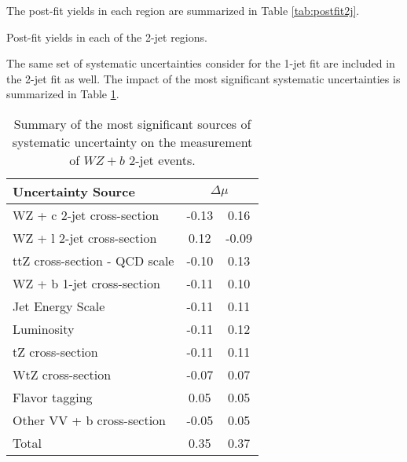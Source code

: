 The post-fit yields in each region are summarized in Table \ref{tab:postfit2j}.

\begin{table}[H]
\begin{adjustwidth}{-3em}{-3em}
\small

\label{tab:postfit2j}
\caption{Post-fit yields in each of the 2-jet regions.}                                                         
\end{adjustwidth}
\end{table}

The same set of systematic uncertainties consider for the 1-jet fit are included in the 2-jet fit as well. The impact of the most significant systematic uncertainties is summarized in Table \ref{tab:systematics_2j}. 

\begin{table}[H]
    \centering
    \begin{tabular}{l|cc}
        \hline\hline
        Uncertainty Source & \multicolumn{2}{c}{$\Delta \mu$ }  \\
        \hline
        WZ + c 2-jet cross-section & -0.13 & 0.16 \\
        WZ + l 2-jet cross-section & 0.12 & -0.09 \\
        ttZ cross-section - QCD scale & -0.10 & 0.13 \\
        WZ + b 1-jet cross-section & -0.11 & 0.10 \\
        Jet Energy Scale & -0.11 & 0.11 \\
        Luminosity & -0.11 & 0.12 \\
        tZ cross-section & -0.11 & 0.11 \\
        WtZ cross-section & -0.07 & 0.07 \\
        Flavor tagging  & 0.05 & 0.05 \\
        Other VV + b cross-section & -0.05 & 0.05 \\
        \hline
        Total & 0.35 & 0.37 \\
        \hline\hline
    \end{tabular}
    \caption{Summary of the most significant sources of systematic uncertainty on the measurement of $WZ+b$ 2-jet events.}
    \label{tab:systematics_2j}
\end{table}

